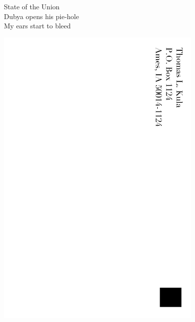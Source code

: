 \documentclass[12pt]{article}
\begin{document}
State of the Union \\
Dubya opens his pie-hole \\
My ears start to bleed



\newpage

\includegraphics[width=101mm]{backpage.png}
\end{document}
